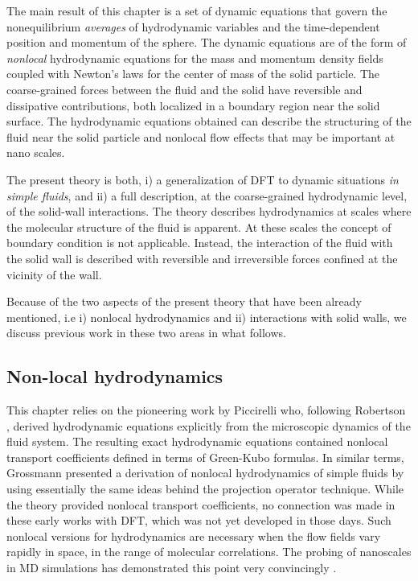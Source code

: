 \documentclass[b5paper,openright,10pt]{book}
\begin{document}
The main result of this chapter is a set of dynamic equations that
govern the nonequilibrium \textit{averages} of hydrodynamic variables
and  the time-dependent  position  and momentum  of  the sphere.   The
dynamic equations  are of the form  of \textit{nonlocal} hydrodynamic
equations  for  the mass  and  momentum  density fields  coupled  with
Newton's  laws for  the center  of mass  of the  solid particle.   The
coarse-grained forces between the fluid  and the solid have reversible
and  dissipative contributions,  both localized  in a  boundary region
near  the  solid surface.   The  hydrodynamic  equations obtained  can
describe  the structuring  of the  fluid near  the solid  particle and
nonlocal flow effects that may be important at nano scales.

The  present  theory  is   both,  i)  a
generalization  of DFT  to dynamic  situations
\textit{in simple  fluids},
and ii) a full description,  at the coarse-grained hydrodynamic level,
of the solid-wall interactions.  The theory describes hydrodynamics at
scales  where the  molecular structure  of the  fluid is  apparent. At
these   scales   the   concept    of   boundary   condition   is   not
applicable. Instead, the interaction of  the fluid with the solid wall
is described with  reversible and irreversible forces  confined at the
vicinity of the wall.

Because  of the  two  aspects of  the present  theory  that have  been
already mentioned, i.e i) nonlocal hydrodynamics and ii) interactions
with solid walls, we discuss previous  work in these two areas in what
follows.

\subsection{Non-local hydrodynamics}
This   chapter    relies   on   the   pioneering    work   by   Piccirelli
\cite{Piccirelli1968}  who, following  Robertson \cite{Robertson1966},
derived  hydrodynamic   equations  explicitly  from   the  microscopic
dynamics  of  the fluid  system.   The  resulting   exact  hydrodynamic  equations
contained  nonlocal  transport  coefficients   defined  in  terms  of
Green-Kubo formulas.  In  similar terms, Grossmann \cite{Grossmann1970}
presented a derivation of nonlocal  hydrodynamics of simple fluids by
using  essentially  the  same  ideas behind  the  projection  operator
technique.    While   the    theory   provided   nonlocal   transport
coefficients, no connection was made in these early works with DFT,  which was not  yet developed in those  days.  Such
nonlocal  versions  for hydrodynamics  are  necessary  when the  flow
fields vary rapidly in space,  in the range of molecular correlations.
The  probing of  nanoscales in  MD simulations  has demonstrated  this
point                         very                        convincingly
\cite{Zhang2004,Hansen2007,Todd2008a,Hansen2011}.
\end{document}
